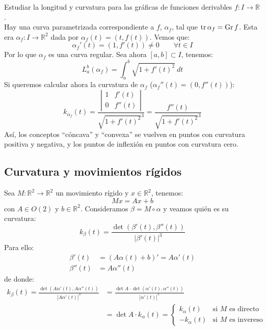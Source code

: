 \begin{ejercicio} 
    Estudiar la longitud y curvatura para las gráficas de funciones derivables $f:I\to \mathbb{R}$.\\

    \noindent
    Hay una curva parametrizada correspondiente a $f$, $\alpha_f$, tal que  $\operatorname{tr} \alpha_f = \operatorname{Gr} f$. Esta era $\alpha_f:I\to \mathbb{R}^2$ dada por $\alpha_f(t) = (t,f(t))$. Vemos que:
    \begin{equation*}
        \alpha_f'(t) = (1, f'(t)) \neq 0 \qquad \forall t\in I
    \end{equation*}
    Por lo que $\alpha_f$ es una curva regular. Sea ahora $[a,b]\subset I$, tenemos: 
    \begin{equation*}
        L_a^b(\alpha_f) = \int_{a}^{b} \sqrt{1+f'(t)^2}~dt 
    \end{equation*}
    Si queremos calcular ahora la curvatura de $\alpha_f$ ($\alpha_f''(t) = (0, f''(t))$):
    \begin{equation*}
        k_{\alpha_f}(t) = \frac{\left|\begin{array}{cc}
            1 & f'(t) \\
            0 & f''(t)
        \end{array}\right|}{\sqrt{1+f'(t)^2}^3} = \frac{f''(t)}{\sqrt{1+f'(t)^2}^3}
    \end{equation*}
    Así, los conceptos ``cóncava'' y ``convexa'' se vuelven en puntos con curvatura positiva y negativa, y los puntos de inflexión en puntos con curvatura cero.
\end{ejercicio}

\subsection{Curvatura y movimientos rígidos}
\noindent
Sea $M:\mathbb{R}^2\to \mathbb{R}^2$ un movimiento rígido y $x\in \mathbb{R}^2$, tenemos:
\begin{equation*}
    Mx = Ax + b
\end{equation*}
con $A\in O(2)$ y $b\in \mathbb{R}^2$. Consideramos $\beta = M\circ \alpha$ y veamos quién es su curvatura:
\begin{equation*}
    k_{\beta}(t) = \frac{\det(\beta'(t),\beta''(t))}{|\beta'(t)|^3} 
\end{equation*}
Para ello:
\begin{align*}
    \beta'(t) &= (A\alpha(t) + b)' = A\alpha'(t) \\
    \beta''(t) &= A \alpha''(t)
\end{align*}
de donde:
\begin{align*} %
    k_{\beta}(t) = \frac{\det(A\alpha'(t), A\alpha''(t))}{|A\alpha'(t)|^3} &= \frac{\det A\cdot  \det(\alpha'(t), \alpha''(t))}{|\alpha'(t)|^3} \\
                 &= \det A \cdot k_\alpha(t) = \left\{\begin{array}{ll}
        k_\alpha(t) & \text{si\ } M \text{\ es directo} \\
        -k_\alpha(t) & \text{si\ } M \text{\ es invereso}
    \end{array}\right. 
\end{align*}

